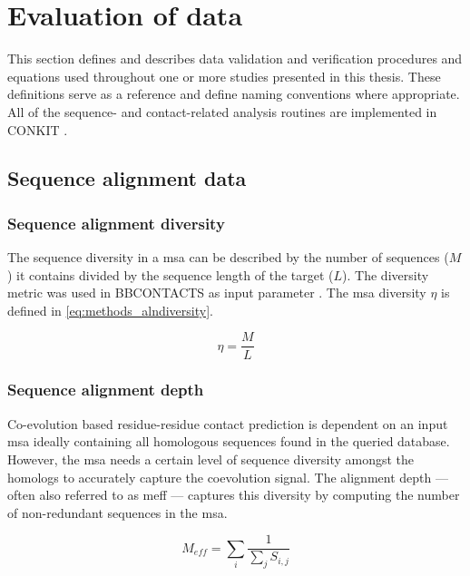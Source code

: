 \section{Evaluation of data}
This section defines and describes data validation and verification procedures and equations used throughout one or more studies presented in this thesis. These definitions serve as a reference and define naming conventions where appropriate. All of the sequence- and contact-related analysis routines are implemented in CONKIT \cite{Simkovic2017-us}.

\subsection{Sequence alignment data}
\subsubsection{Sequence alignment diversity}
The sequence diversity in a \gls{msa} can be described by the number of sequences ($M$) it contains divided by the sequence length of the target ($L$). The diversity metric was used in BBCONTACTS as input parameter \cite{Andreani2015-qn}. The \gls{msa} diversity $\eta$ is defined in \cref{eq:methods_alndiversity}.

\begin{equation}
    \eta=\frac{M}{L}
    \label{eq:methods_alndiversity}
\end{equation}

\subsubsection{Sequence alignment depth}
Co-evolution based residue-residue contact prediction is dependent on an input \gls{msa} ideally containing all homologous sequences found in the queried database. However, the \gls{msa} needs a certain level of sequence diversity amongst the homologs to accurately capture the coevolution signal. The alignment depth --- often also referred to as \gls{meff} --- captures this diversity by computing the number of non-redundant sequences in the \gls{msa}.

\begin{equation}
    M_{eff}=\sum_{i}\frac{1}{\sum_{j}S_{i,j}}
    \label{eq:methods_meff}
\end{equation}


